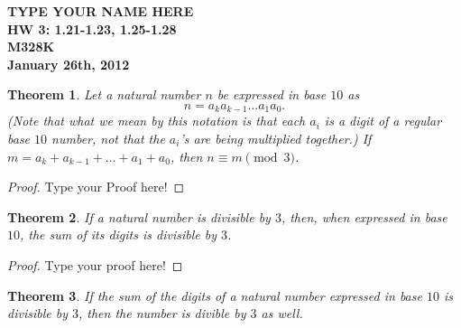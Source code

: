 \documentclass[12pt,leqno]{article}
\numberwithin{equation}{section}
\newtheorem{thm}{Theorem}[section]
\theoremstyle{definition}
\begin{document}
\thispagestyle{plain}
\begin{flushright}
\large{\textbf{TYPE YOUR NAME HERE \\
HW 3: 1.21-1.23, 1.25-1.28\\
M328K \\
January 26th, 2012 \\}}
\end{flushright}

\markboth{}{} \setcounter{section}{0} \baselineskip=18pt

\setcounter{tocdepth}{4}



\setcounter{section}{1}

\setcounter{thm}{20}
\begin{thm}
Let a natural number $n$ be expressed in base $10$ as \[n = a_k
a_{k-1} \hdots a_1 a_0.\]  (Note that what we mean by this notation
is that each $a_i$ is a digit of a regular base $10$ number, not
that the $a_i$'s are being multiplied together.) If $m = a_k +
a_{k-1} + \hdots + a_1 + a_0$, then $n \equiv m \pmod{3}$.
\end{thm}

\begin{proof}[Proof]
Type your Proof here!
\end{proof}

\begin{thm}
If a natural number is divisible by $3$, then, when expressed in
base $10$, the sum of its digits is divisible by $3$.
\end{thm}

\begin{proof}[Proof]
Type your proof here!
\end{proof}

\begin{thm}
If the sum of the digits of a natural number expressed in base $10$
is divisible by $3$, then the number is divible by $3$ as well.
\end{thm}
\end{document}
